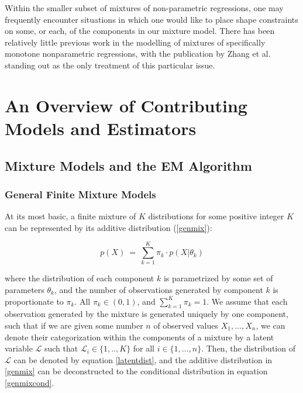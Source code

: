 \documentclass[10pt]{olplainarticle}\usepackage[]{graphicx}\usepackage[]{color}
\begin{document}
Within the smaller subset of mixtures of non-parametric regressions, one may frequently encounter situations in which one would like to place shape constraints on some, or each, of the components in our mixture model. There has been relatively little previous work in the modelling of mixtures of specifically monotone nonparametric regressions, with the publication by Zhang et al. standing out as the only treatment of this particular issue. 


\section{An Overview of Contributing Models and Estimators}

\subsection{Mixture Models and the EM Algorithm}

\subsubsection{General Finite Mixture Models}

At its most basic, a finite mixture of $K$ distributions for some positive integer $K$ can be represented by its additive distribution (\ref{genmix}):

\begin{equation} \label{genmix}
  p(X) \ =\ \sum_{k=1}^{K} \pi_k \cdot p(X | \theta_k)
\end{equation}

where the distribution of each component $k$ is parametrized by some set of parameters $\theta_k$, and the number of observations generated by component $k$ is proportionate to $\pi_k$. All $\pi_k \in (0,1)$, and $\sum_{k=1}^{K}\pi_k = 1$. We assume that each observation generated by the mixture is generated uniquely by one component, such that if we are given some number $n$ of observed values $X_1,...,X_n$, we can denote their categorization within the components of a mixture by a latent variable $\mathcal{L}$ such that $\mathcal{L}_i \in \{1,..,K\}$ for all $i \in \{1,...,n\}$. Then, the distribution of $\mathcal{L}$ can be denoted by equation \ref{latentdist}, and the additive distribution in \ref{genmix} can be deconstructed to the conditional distribution in equation \ref{genmixcond}.
\end{document}
